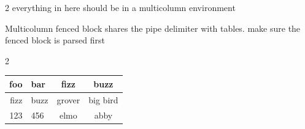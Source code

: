 
\bigskip

\begin{multicols}{2}
    everything in here should be in a multicolumn environment
\end{multicols}

\bigskip

Multicolumn fenced block shares the pipe delimiter with tables. make sure the fenced block is parsed first

\bigskip

\begin{multicols}{2}

\begin{center}

    \begin{tabular}{r l c c}
    foo & bar & fizz & buzz \\
    \hline
    fizz & buzz & grover & big bird \\
    123 & 456 & elmo & abby \\
  \end{tabular}

\end{center}
\end{multicols}

\bigskip